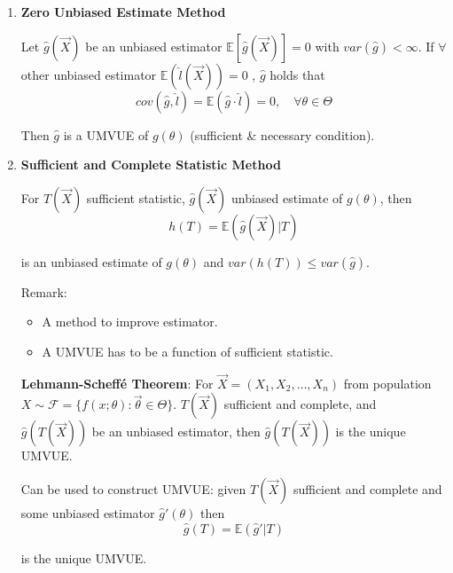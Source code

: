     \begin{enumerate}[topsep=2pt,itemsep=0pt]
    \item \textbf{Zero Unbiased Estimate Method}
                
        Let $\hat{g}(\vec{X})$ be an unbiased estimator $ \mathbb{E}\left[ \hat{g}(\vec{X}) \right] =0 $ with $var(\hat{g})<\infty$. If $\forall$ other unbiased estimator $\mathbb{E}(\hat{l}(\vec{X}))=0$ , $\hat{g}$ holds that
        \begin{equation}
            cov(\hat{g},\hat{l})=\mathbb{E}(\hat{g}\cdot\hat{l})=0,\quad\forall\theta\in\Theta    
        \end{equation}

        Then $\hat{g}$ is a UMVUE of $g(\theta)$ (sufficient \& necessary condition).
    \item \textbf{Sufficient and Complete Statistic Method}

        For $T(\vec{X})$ sufficient statistic, $\hat{g}(\vec{X})$ unbiased estimate of $g(\theta)$, then 
    \begin{equation}
        h(T)=\mathbb{E}(\hat{g}(\vec{X})| T)    
    \end{equation}

        is an unbiased estimate of $g(\theta)$ and $var(h(T))\leq var(\hat{g})$.

        Remark:
        \begin{itemize}
            \item A method to improve estimator.
            \item A UMVUE has to be a function of sufficient statistic.
        \end{itemize}

        \textbf{Lehmann-Scheffé Theorem}: For $\vec{X}=(X_1,X_2,\ldots,X_n)$ from population $X\sim\mathscr{F}=\{f(x;\theta):\vec{\theta}\in\Theta\}$. $T(\vec{X})$ sufficient and complete, and $\hat{g}(T(\vec{X}))$ be an unbiased estimator, then $\hat{g}(T(\vec{X}))$ is the unique UMVUE.

        Can be used to construct UMVUE: given $T(\vec{X})$ sufficient and complete and some unbiased estimator $\hat{g}\prime(\theta)$ then 
        \begin{equation}
            \hat{g}(T)=\mathbb{E}(\hat{g}\prime|T)    
        \end{equation}

        is the unique UMVUE.




\end{enumerate}
